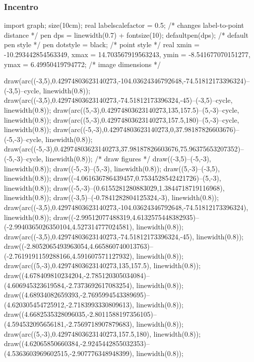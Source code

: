 \documentclass[11pt]{scrartcl}
\begin{document}
	\subsubsection{Incentro}
	
	\begin{center}
		\begin{asy}
			import graph; size(10cm); 
			real labelscalefactor = 0.5; /* changes label-to-point distance */
			pen dps = linewidth(0.7) + fontsize(10); defaultpen(dps); /* default pen style */ 
			pen dotstyle = black; /* point style */ 
			real xmin = -10.293442854563349, xmax = 14.703567919563243, ymin = -8.541677070151277, ymax = 6.49950419794772;  /* image dimensions */
			
			
			draw(arc((-3,5),0.42974803623140273,-104.03624346792648,-74.51812173396324)--(-3,5)--cycle, linewidth(0.8)); 
			draw(arc((-3,5),0.42974803623140273,-74.51812173396324,-45)--(-3,5)--cycle, linewidth(0.8)); 
			draw(arc((5,-3),0.42974803623140273,135,157.5)--(5,-3)--cycle, linewidth(0.8)); 
			draw(arc((5,-3),0.42974803623140273,157.5,180)--(5,-3)--cycle, linewidth(0.8)); 
			draw(arc((-5,-3),0.42974803623140273,0,37.98187826603676)--(-5,-3)--cycle, linewidth(0.8)); 
			draw(arc((-5,-3),0.42974803623140273,37.98187826603676,75.96375653207352)--(-5,-3)--cycle, linewidth(0.8)); 
			/* draw figures */
			draw((-3,5)--(-5,-3), linewidth(0.8)); 
			draw((-5,-3)--(5,-3), linewidth(0.8)); 
			draw((5,-3)--(-3,5), linewidth(0.8)); 
			draw((-4.061636786439457,0.7534528542421726)--(5,-3), linewidth(0.8)); 
			draw((-5,-3)--(0.6155281280883029,1.3844718719116968), linewidth(0.8)); 
			draw((-3,5)--(-0.7841282804125324,-3), linewidth(0.8)); 
			draw(arc((-3,5),0.42974803623140273,-104.03624346792648,-74.51812173396324), linewidth(0.8)); 
			draw((-2.99512077488319,4.6132575448382935)--(-2.9940365026350104,4.527314777024581), linewidth(0.8)); 
			draw(arc((-3,5),0.42974803623140273,-74.51812173396324,-45), linewidth(0.8)); 
			draw((-2.8052065493963054,4.665860740013763)--(-2.7619191159288166,4.591607571127932), linewidth(0.8)); 
			draw(arc((5,-3),0.42974803623140273,135,157.5), linewidth(0.8)); 
			draw((4.678409810234204,-2.785120305034084)--(4.606945323619584,-2.7373692617083254), linewidth(0.8)); 
			draw((4.68934082659393,-2.7695994543389695)--(4.620305454725912,-2.7183993330809613), linewidth(0.8)); 
			draw((4.6682535328096035,-2.8011588197356105)--(4.594532095656181,-2.7569718907879683), linewidth(0.8)); 
			draw(arc((5,-3),0.42974803623140273,157.5,180), linewidth(0.8)); 
			draw((4.62065850660384,-2.9245442855032353)--(4.5363603969602515,-2.907776348948399), linewidth(0.8)); 

\end{asy}
\end{center}
\end{document}
